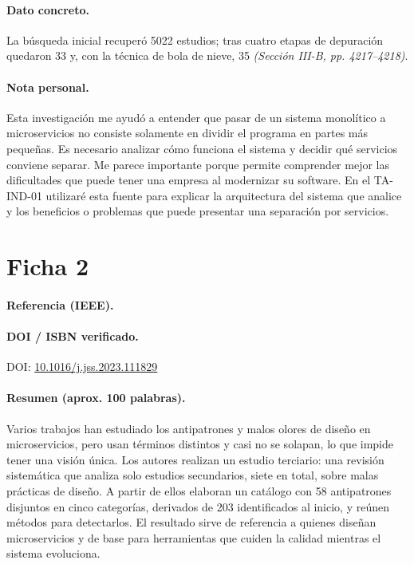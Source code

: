 \documentclass[12pt,a4paper]{article}
\begin{document}
\paragraph{Dato concreto.}
La búsqueda inicial recuperó 5022 estudios; tras cuatro etapas de depuración quedaron 33 y, con la técnica de bola de nieve, 35 \textit{(Sección III-B, pp. 4217--4218)}.

\paragraph{Nota personal.}
Esta investigación me ayudó a entender que pasar de un sistema monolítico a microservicios no consiste solamente en dividir el programa en partes más pequeñas. Es necesario analizar cómo funciona el sistema y decidir qué servicios conviene separar. Me parece importante porque permite comprender mejor las dificultades que puede tener una empresa al modernizar su software. En el TA-IND-01 utilizaré esta fuente para explicar la arquitectura del sistema que analice y los beneficios o problemas que puede presentar una separación por servicios.

\clearpage

\section{Ficha 2}

\paragraph{Referencia (IEEE).}

\paragraph{DOI / ISBN verificado.}
DOI: \href{https://doi.org/10.1016/j.jss.2023.111829}{10.1016/j.jss.2023.111829}

\paragraph{Resumen (aprox. 100 palabras).}
Varios trabajos han estudiado los antipatrones y malos olores de diseño en microservicios, pero usan términos distintos y casi no se solapan, lo que impide tener una visión única. Los autores realizan un estudio terciario: una revisión sistemática que analiza solo estudios secundarios, siete en total, sobre malas prácticas de diseño. A partir de ellos elaboran un catálogo con 58 antipatrones disjuntos en cinco categorías, derivados de 203 identificados al inicio, y reúnen métodos para detectarlos. El resultado sirve de referencia a quienes diseñan microservicios y de base para herramientas que cuiden la calidad mientras el sistema evoluciona.
\end{document}
